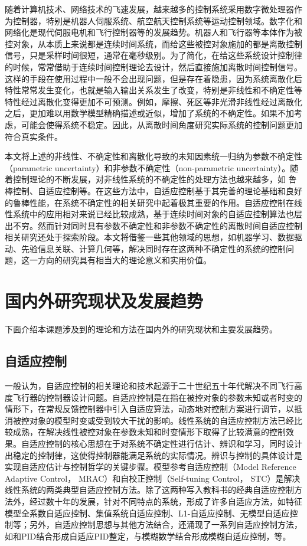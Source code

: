 随着计算机技术、网络技术的飞速发展，越来越多的控制系统采用数字微处理器作为控制器，特别是机器人伺服系统、航空航天控制系统等运动控制领域。数字化和网络化是现代伺服电机和飞行控制器等的发展趋势。机器人和飞行器等本体作为被控对象，从本质上来说都是连续时间系统，而给这些被控对象施加的都是离散控制信号，只是采样时间很短，通常在毫秒级别。为了简化，在给这些系统设计控制律的时候，常常借助于连续时间控制理论去设计，然后直接施加离散时间控制信号。这样的手段在使用过程中一般不会出现问题，但是存在着隐患，因为系统离散化后特性常常发生变化，也就是输入输出关系发生了改变，特别是非线性和不确定性等特性经过离散化变得更加不可预测。例如，摩擦、死区等非光滑非线性经过离散化之后，更加难以用数学模型精确描述或近似，增加了系统的不确定性。如果不加考虑，可能会使得系统不稳定。因此，从离散时间角度研究实际系统的控制问题更加符合真实条件。

本文将上述的非线性、不确定性和离散化导致的未知因素统一归纳为参数不确定性（parametric uncertainty）和非参数不确定性（non-parametric uncertainty）。随着控制理论的不断发展，对非线性系统的不确定性的处理方法也越来越多，如 鲁棒控制、自适应控制等。在这些方法中，自适应控制基于其完善的理论基础和良好的鲁棒性能，在系统不确定性的相关研究中起着极其重要的作用。自适应控制在线性系统中的应用相对来说已经比较成熟，基于连续时间对象的自适应控制算法也层出不穷。然而针对同时具有参数不确定性和非参数不确定性的离散时间自适应控制相关研究还处于探索阶段。本文将借鉴一些其他领域的思想，如机器学习、数据驱动、先验信息关联、计算几何等，解决同时存在这两种不确定性的系统的控制问题，这一方向的研究具有相当大的理论意义和实用价值。

\section{国内外研究现状及发展趋势}\label{sect:1.2}
下面介绍本课题涉及到的理论和方法在国内外的研究现状和主要发展趋势。
\subsection{自适应控制}%

一般认为，自适应控制的相关理论和技术起源于二十世纪五十年代解决不同飞行高度飞行器的控制器设计问题。自适应控制是在指在被控对象的参数未知或者时变的情形下，在常规反馈控制器中引入自适应算法，动态地对控制方案进行调节，以抵消被控对象的模型时变或受到较大干扰的影响。线性系统的自适应控制方法已经比较成熟，在解决线性被控对象在参数未知和时变情形下取得了比较满意的控制效果。自适应控制的核心思想在于对系统不确定性进行估计、辨识和学习，同时设计出稳定的控制律，这使得控制器能满足系统的实际情况。辨识与控制的具体设计是实现自适应估计与控制哲学的关键步骤。模型参考自适应控制（Model Reference Adaptive Control， MRAC）和自校正控制（Self-tuning Control， STC）是解决线性系统的两类典型自适应控制方法。除了这两种写入教科书的经典自适应控制方法外，经过数十年的发展，针对不同特点的系统，形成了许多自适应方法，如特征模型全系数自适应控制、集值系统自适应控制、L1-自适应控制、无模型自适应控制等；另外，自适应控制思想与其他方法结合，还涌现了一系列自适应控制方法，如和PID结合形成自适应PID整定，与模糊数学结合形成模糊自适应控制，等。

